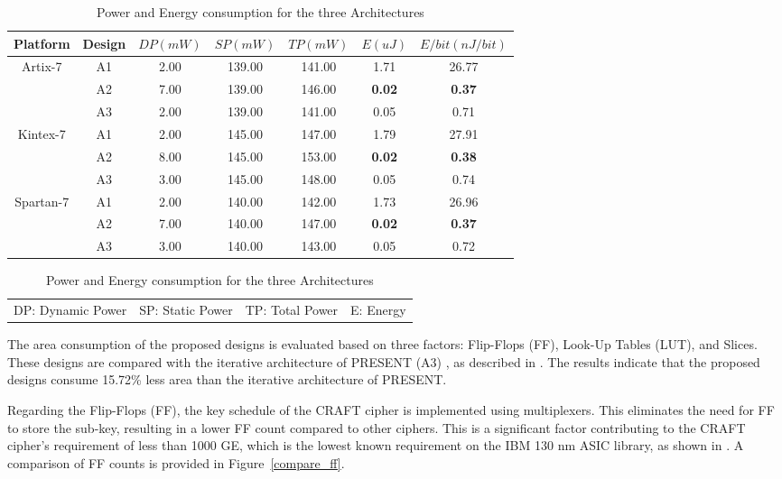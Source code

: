 \documentclass[final,5p,times,twocolumn]{elsarticle}
\begin{document}
\begin{table}
    \begin{threeparttable}
        \caption{Power and Energy consumption for the three Architectures}\label{power_energy_compare}%
        \begin{tabular*}{\textwidth}{@{\extracolsep\fill}|c|c|c|c|c|c|c|}
            \hline
            Platform & Design & $DP(mW)$ & $SP(mW)$ & $TP(mW)$ & $E(uJ)$ & $E/bit(nJ/bit)$ \\
            \hline
            \multirow{3}{*}{Artix-7}  & A1 & 2.00 & 139.00 & 141.00 & 1.71 & 26.77 \\
            & A2 & 7.00 & 139.00 & 146.00 & \textbf{0.02} & \textbf{0.37} \\
            & A3 & 2.00 & 139.00 & 141.00 & 0.05 & 0.71 \\
            \hline
            \multirow{3}{*}{Kintex-7} & A1 & 2.00 & 145.00 & 147.00 & 1.79 & 27.91 \\
            & A2 & 8.00 & 145.00 & 153.00 & \textbf{0.02} & \textbf{0.38} \\
            & A3 & 3.00 & 145.00 & 148.00 & 0.05 & 0.74 \\
            \hline
            \multirow{3}{*}{Spartan-7} & A1 & 2.00 & 140.00 & 142.00 & 1.73 & 26.96 \\
            & A2 & 7.00 & 140.00 & 147.00 & \textbf{0.02} & \textbf{0.37} \\
            & A3 & 3.00 & 140.00 & 143.00 & 0.05 & 0.72 \\
            \hline
        \end{tabular*}
        \begin{tabular}{llll}
            DP: Dynamic Power & SP: Static Power & TP: Total Power & E: Energy
        \end{tabular}
    \end{threeparttable}
\end{table}

The area consumption of the proposed designs is evaluated based on three factors: Flip-Flops (FF), Look-Up Tables (LUT), and Slices. These designs are compared with the iterative architecture of PRESENT (A3) , as described in \cite{bharathi2022light}. The results indicate that the proposed designs consume 15.72\% less area than the iterative architecture of PRESENT.

Regarding the Flip-Flops (FF), the key schedule of the CRAFT cipher is implemented using multiplexers. This eliminates the need for FF to store the sub-key, resulting in a lower FF count compared to other ciphers. This is a significant factor contributing to the CRAFT cipher's requirement of less than 1000 GE, which is the lowest known requirement on the IBM 130 nm ASIC library, as shown in \cite{beierle2019craft}. A comparison of FF counts is provided in Figure~\ref{compare_ff}.
\end{document}
